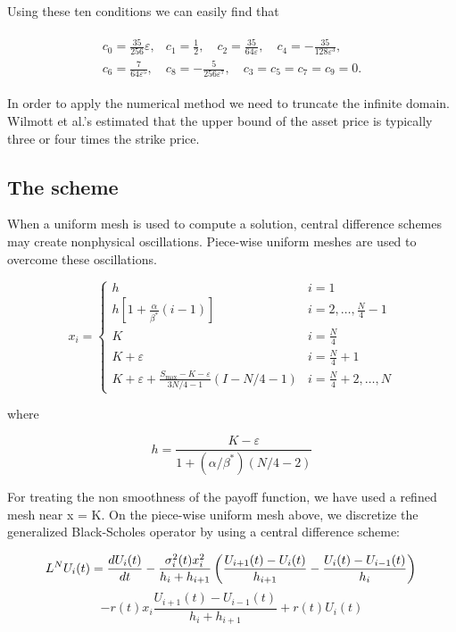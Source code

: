 Using these ten conditions we can easily find that

$$
\begin{aligned}
\begin{array}{ll}c_{0}=\frac{35}{256} \varepsilon, & c_{1}=\frac{1}{2}, \quad c_{2}=\frac{35}{64 \varepsilon}, \quad c_{4}=-\frac{35}{128 \varepsilon^{3}}, \\ c_{6}=\frac{7}{64 \varepsilon^{5}}, & c_{8}=-\frac{5}{256 \varepsilon^{7}}, \quad c_{3}=c_{5}=c_{7}=c_{9}=0 .\end{array}
\end{aligned}
$$

In order to apply the numerical method we need to truncate the infinite domain. Wilmott et al.’s estimated that the upper bound of the asset price is typically three or four times the strike price.

\subsection{The scheme}
When a uniform mesh is used to compute a solution, central difference schemes may create nonphysical oscillations. Piece-wise uniform meshes are used to overcome these oscillations.

$$
x_{i}= \begin{cases}h & i=1 \\ h\left[1+\frac{\alpha}{\beta^{*}}(i-1)\right] & i=2, \ldots, \frac{N}{4}-1 \\ K & i=\frac{N}{4} \\ K+\varepsilon & i=\frac{N}{4}+1 \\ K+\varepsilon+\frac{S_{\max }-K-\varepsilon}{3 N / 4-1}(I-N / 4-1) & i=\frac{N}{4}+2, \ldots, N\end{cases}
$$

where

$$
h=\frac{K-\varepsilon}{1+\left(\alpha / \beta^{*}\right)(N / 4-2)}
$$

For treating the non smoothness of the payoff function, we have used a refined mesh near x = K. On the piece-wise uniform mesh above, we discretize the generalized Black-Scholes operator by using a central difference scheme:

$$
L^{N} U_{i}(t) = \frac{d U_{i}(t)}{d t}-\frac{\sigma_{i}^{2}(t) x_{i}^{2}}{h_{i}+h_{i+1}}\left(\frac{U_{i+1}(t)-U_{i}(t)}{h_{i+1}}-\frac{U_{i}(t)-U_{i-1}(t)}{h_{i}}\right) \\
$$
$$
-r(t) x_{i} \frac{U_{i+1}(t)-U_{i-1}(t)}{h_{i}+h_{i+1}}+r(t) U_{i}(t)
$$

